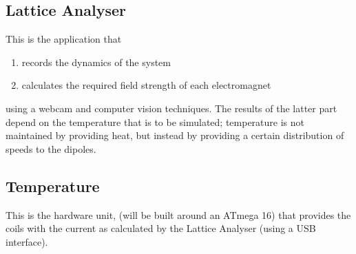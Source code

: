 	\subsection{Lattice Analyser}
		This is the application that
		\begin{enumerate}
			\item records the dynamics of the system
			\item calculates the required field strength of each electromagnet
		\end{enumerate}
		using a webcam and computer vision techniques. The results of the latter part depend on the temperature that is to be simulated; temperature is not maintained by providing heat, but instead by providing a certain distribution of speeds to the dipoles.
	\subsection{Temperature}
		This is the hardware unit, (will be built around an ATmega 16) that provides the coils with the current as calculated by the Lattice Analyser (using a USB interface).